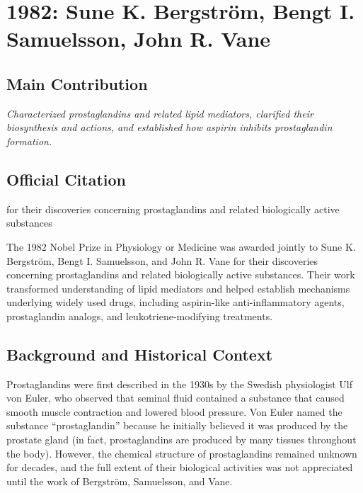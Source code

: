\chapter[1982 --- Bergstrom et al.]{1982: Sune K. Bergstr\"om, Bengt I. Samuelsson, John R. Vane}
\label{ch:1982_Bergstrom}

\section*{Main Contribution}

\textit{Characterized prostaglandins and related lipid mediators, clarified their biosynthesis and actions, and established how aspirin inhibits prostaglandin formation.}\cite{nobel-1982,lecture-1982,lecture-samuelsson-1982,lecture-vane-1982}

\section{Official Citation}

for their discoveries concerning prostaglandins and related biologically active substances

The 1982 Nobel Prize in Physiology or Medicine was awarded jointly to Sune K. Bergstr\"om, Bengt I. Samuelsson, and John R. Vane for their discoveries concerning prostaglandins and related biologically active substances. Their work transformed understanding of lipid mediators and helped establish mechanisms underlying widely used drugs, including aspirin-like anti-inflammatory agents, prostaglandin analogs, and leukotriene-modifying treatments.

\section{Background and Historical Context}

Prostaglandins were first described in the 1930s by the Swedish physiologist Ulf von Euler, who observed that seminal fluid contained a substance that caused smooth muscle contraction and lowered blood pressure. Von Euler named the substance ``prostaglandin'' because he initially believed it was produced by the prostate gland (in fact, prostaglandins are produced by many tissues throughout the body). However, the chemical structure of prostaglandins remained unknown for decades, and the full extent of their biological activities was not appreciated until the work of Bergstr\"om, Samuelsson, and Vane.

